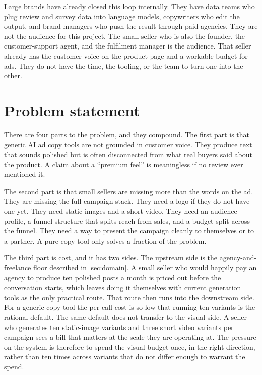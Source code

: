 \documentclass[12pt,a4paper]{report}
\begin{document}
Large brands have already closed this loop internally. They have data teams who plug review and survey data into language models, copywriters who edit the output, and brand managers who push the result through paid agencies. They are not the audience for this project. The small seller who is also the founder, the customer-support agent, and the fulfilment manager is the audience. That seller already has the customer voice on the product page and a workable budget for ads. They do not have the time, the tooling, or the team to turn one into the other.

\section{Problem statement}
\label{sec:problem}

There are four parts to the problem, and they compound. The first part is that generic AI ad copy tools are not grounded in customer voice. They produce text that sounds polished but is often disconnected from what real buyers said about the product. A claim about a ``premium feel'' is meaningless if no review ever mentioned it.

The second part is that small sellers are missing more than the words on the ad. They are missing the full campaign stack. They need a logo if they do not have one yet. They need static images and a short video. They need an audience profile, a funnel structure that splits reach from sales, and a budget split across the funnel. They need a way to present the campaign cleanly to themselves or to a partner. A pure copy tool only solves a fraction of the problem.

The third part is cost, and it has two sides. The upstream side is the agency-and-freelance floor described in \cref{sec:domain}. A small seller who would happily pay an agency to produce ten polished posts a month is priced out before the conversation starts, which leaves doing it themselves with current generation tools as the only practical route. That route then runs into the downstream side. For a generic copy tool the per-call cost is so low that running ten variants is the rational default. The same default does not transfer to the visual side. A seller who generates ten static-image variants and three short video variants per campaign sees a bill that matters at the scale they are operating at. The pressure on the system is therefore to spend the visual budget once, in the right direction, rather than ten times across variants that do not differ enough to warrant the spend.
\end{document}
